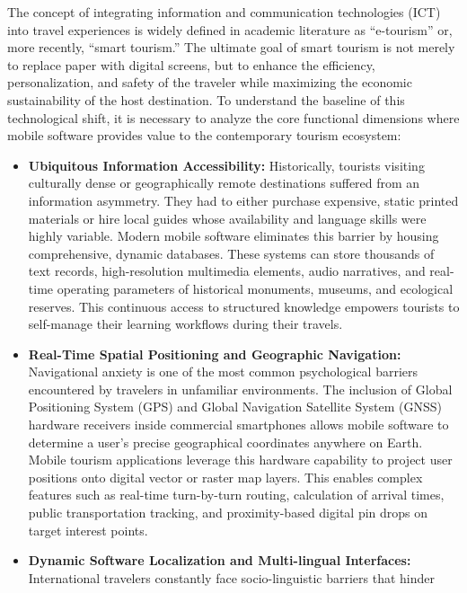 \documentclass[12pt,a4paper,oneside]{report}
\begin{document}
The concept of integrating information and communication technologies (ICT) into travel
experiences is widely defined in academic literature as ``e-tourism'' or, more recently,
``smart tourism.'' The ultimate goal of smart tourism is not merely to replace paper
with digital screens, but to enhance the efficiency, personalization, and safety of the
traveler while maximizing the economic sustainability of the host destination. To
understand the baseline of this technological shift, it is necessary to analyze the core
functional dimensions where mobile software provides value to the contemporary tourism
ecosystem:

\begin{itemize}[leftmargin=1.4em]
  \item \textbf{Ubiquitous Information Accessibility:} Historically, tourists visiting
        culturally dense or geographically remote destinations suffered from an
        information asymmetry. They had to either purchase expensive, static printed
        materials or hire local guides whose availability and language skills were
        highly variable. Modern mobile software eliminates this barrier by housing
        comprehensive, dynamic databases. These systems can store thousands of text
        records, high-resolution multimedia elements, audio narratives, and real-time
        operating parameters of historical monuments, museums, and ecological reserves.
        This continuous access to structured knowledge empowers tourists to self-manage
        their learning workflows during their travels.
  \item \textbf{Real-Time Spatial Positioning and Geographic Navigation:} Navigational
        anxiety is one of the most common psychological barriers encountered by
        travelers in unfamiliar environments. The inclusion of Global Positioning System
        (GPS) and Global Navigation Satellite System (GNSS) hardware receivers inside
        commercial smartphones allows mobile software to determine a user's precise
        geographical coordinates anywhere on Earth. Mobile tourism applications leverage
        this hardware capability to project user positions onto digital vector or raster
        map layers. This enables complex features such as real-time turn-by-turn routing,
        calculation of arrival times, public transportation tracking, and
        proximity-based digital pin drops on target interest points.
  \item \textbf{Dynamic Software Localization and Multi-lingual Interfaces:}
        International travelers constantly face socio-linguistic barriers that hinder

\end{itemize}
\end{document}
